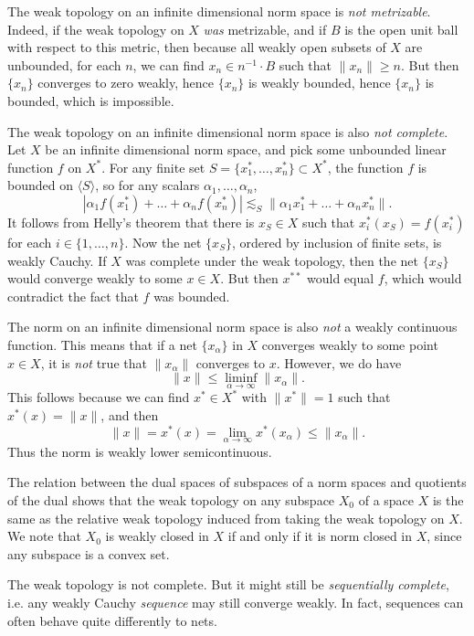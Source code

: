 The weak topology on an infinite dimensional norm space is \emph{not metrizable}. Indeed, if the weak topology on $X$ \emph{was} metrizable, and if $B$ is the open unit ball with respect to this metric, then because all weakly open subsets of $X$ are unbounded, for each $n$, we can find $x_n \in n^{-1} \cdot B$ such that $\| x_n \| \geq n$. But then $\{ x_n \}$ converges to zero weakly, hence $\{ x_n \}$ is weakly bounded, hence $\{ x_n \}$ is bounded, which is impossible.

The weak topology on an infinite dimensional norm space is also \emph{not complete}. Let $X$ be an infinite dimensional norm space, and pick some unbounded linear function $f$ on $X^*$. For any finite set $S = \{ x_1^*, \dots, x_n^* \} \subset X^*$, the function $f$ is bounded on $\langle S \rangle$, so for any scalars $\alpha_1,\dots,\alpha_n$,
%
\[ |\alpha_1 f(x_1^*) + \dots + \alpha_n f(x_n^*)| \lesssim_S \| \alpha_1 x_1^* + \dots + \alpha_n x_n^* \|. \]
%
It follows from Helly's theorem that there is $x_S \in X$ such that $x_i^*(x_S) = f(x_i^*)$ for each $i \in \{ 1, \dots, n \}$. Now the net $\{ x_S \}$, ordered by inclusion of finite sets, is weakly Cauchy. If $X$ was complete under the weak topology, then the net $\{ x_S \}$ would converge weakly to some $x \in X$. But then $x^{**}$ would equal $f$, which would contradict the fact that $f$ was bounded.

The norm on an infinite dimensional norm space is also \emph{not} a weakly continuous function. This means that if a net $\{ x_\alpha \}$ in $X$ converges weakly to some point $x \in X$, it is \emph{not} true that $\| x_\alpha \|$ converges to $x$. However, we do have
%
\[ \| x \| \leq \liminf_{\alpha \to \infty} \| x_\alpha \|. \]
%
This follows because we can find $x^* \in X^*$ with $\| x^* \| = 1$ such that $x^*(x) = \| x \|$, and then
%
\[ \| x \| = x^*(x) = \lim_{\alpha \to \infty} x^*(x_\alpha) \leq \| x_\alpha \|. \]
%
Thus the norm is weakly lower semicontinuous.

The relation between the dual spaces of subspaces of a norm spaces and quotients of the dual shows that the weak topology on any subspace $X_0$ of a space $X$ is the same as the relative weak topology induced from taking the weak topology on $X$. We note that $X_0$ is weakly closed in $X$ if and only if it is norm closed in $X$, since any subspace is a convex set.

The weak topology is not complete. But it might still be \emph{sequentially complete}, i.e. any weakly Cauchy \emph{sequence} may still converge weakly. In fact, sequences can often behave quite differently to nets.

